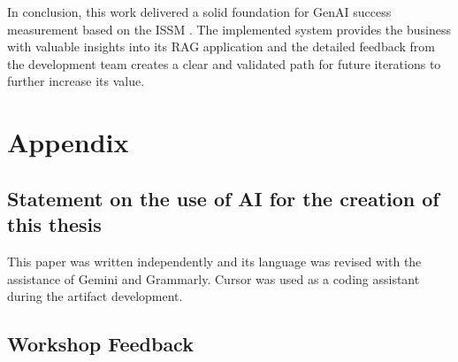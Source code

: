 \documentclass[
	english,
	ruledheaders=section,%
	class=report,%
	thesis={type=bachelor},%
	accentcolor=1b,%
	custommargins=true,%
	marginpar=false,%
	parskip=half-,%
	fontsize=11pt,%
	DIV=14,
]{tudapub}
\begin{document}
In conclusion, this work delivered a solid foundation for GenAI success measurement based on the ISSM \parencite{DeloneMcLean2003ISSuccessTenYearUpdate}. The implemented system provides the business with valuable insights into its RAG application and the detailed feedback from the development team creates a clear and validated path for future iterations to further increase its value.
\appendix

\chapter*{Appendix}

\setcounter{page}{\value{seitenzahlroemisch}}

\section*{Statement on the use of AI for the creation of this thesis}
This paper was written independently and its language was revised with the assistance of Gemini and Grammarly. Cursor was used as a coding assistant during the artifact development.
\newpage
\section*{Workshop Feedback}
\end{document}
